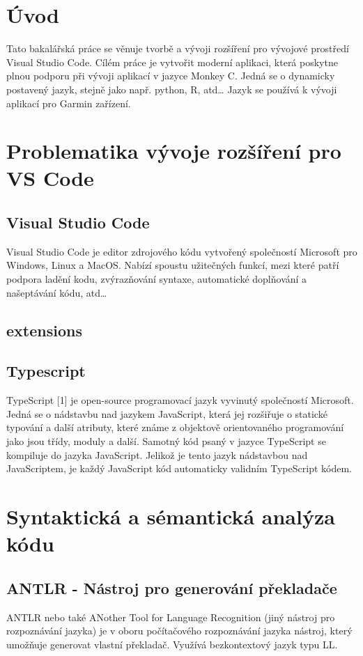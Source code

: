 \documentclass[czech,master,dept460,male,cpp,cpdeclaration]{diploma}
\begin{document}
\MakeTitlePages
\section{Úvod}
\label{sec:Introduction}
Tato bakalářská práce se věnuje tvorbě a vývoji rozšíření pro vývojové prostředí Visual Studio Code. Cílém práce je vytvořit moderní aplikaci, která poskytne plnou podporu při vývoji aplikací v jazyce Monkey C. Jedná se o dynamicky postavený jazyk, stejně jako např. python, R, atd… Jazyk se používá k vývoji aplikací pro Garmin zařízení. 



\section{Problematika vývoje rozšíření pro VS Code}
\subsection{Visual Studio Code}
Visual Studio Code je editor zdrojového kódu vytvořený společností Microsoft pro Windows, Linux a MacOS. Nabízí spoustu užitečných funkcí, mezi které patří podpora ladění kodu, zvýrazňování syntaxe, automatické doplňování a našeptávání kódu, atd…
\subsection{extensions}

\subsection{Typescript}
TypeScript [1] je open-source programovací jazyk vyvinutý společností Microsoft. Jedná se o nádstavbu nad jazykem JavaScript,
která jej rozšiřuje o statické typování a další atributy, které známe z objektově orientovaného programování jako jsou třídy, moduly a další. Samotný kód psaný v jazyce TypeScript se kompiluje
do jazyka JavaScript. Jelikož je tento jazyk nádstavbou nad JavaScriptem, je každý JavaScript kód automaticky validním TypeScript kódem.



\section{Syntaktická a sémantická analýza kódu}
\subsection{ANTLR - Nástroj pro generování překladače}
ANTLR nebo také ANother Tool for Language Recognition (jiný nástroj pro rozpoznávání jazyka) je v oboru počítačového rozpoznávání jazyka nástroj, který umožňuje generovat vlastní překladač. Využívá bezkontextový jazyk typu LL.
\end{document}

